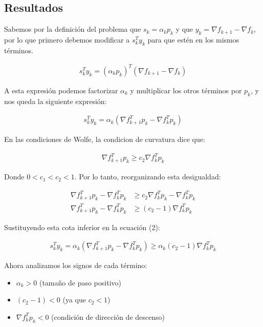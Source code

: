 \documentclass{article}
\begin{document}
\subsection{Resultados}
\setcounter{equation}{0}

Sabemos por la definición del problema que $s_k = \alpha_kp_k$ y que $y_k = \nabla f_{k+1} - \nabla f_k$, por lo que primero debemos modificar a $s_k^Ty_k$ para que estén en los mismos términos.

\begin{align}
    s_k^Ty_k = (\alpha_k p_k)^T(\nabla f_{k+1} - \nabla f_k)
\end{align}

A esta expresión podemos factorizar $\alpha_k$ y multiplicar los otros términos por $p_k$, y nos queda la siguiente expresión:

\begin{align}
    s_k^Ty_k = \alpha_k(\nabla f_{k+1}^Tp_k - \nabla f_k^Tp_k)
\end{align}

En las condiciones de Wolfe, la condicion de curvatura dice que:

\begin{align}
    \nabla f_{k+1}^T p_k \geq c_2 \nabla f_k^T p_k
\end{align}

Donde $0 < c_1 < c_2 < 1$. Por lo tanto, reorganizando esta desigualdad:

\begin{align}
    \nabla f_{k+1}^T p_k - \nabla f_k^T p_k &\geq c_2 \nabla f_k^T p_k - \nabla f_k^T p_k \\
    \nabla f_{k+1}^T p_k - \nabla f_k^T p_k &\geq (c_2 - 1) \nabla f_k^T p_k
\end{align}

Sustituyendo esta cota inferior en la ecuación (2):

\begin{align}
    s_k^Ty_k = \alpha_k(\nabla f_{k+1}^Tp_k - \nabla f_k^Tp_k) \geq \alpha_k(c_2 - 1) \nabla f_k^T p_k
\end{align}

Ahora analizamos los signos de cada término:

\begin{itemize}
    \item $\alpha_k > 0$ (tamaño de paso positivo)
    \item $(c_2 - 1) < 0$ (ya que $c_2 < 1$)
    \item $\nabla f_k^T p_k < 0$ (condición de dirección de descenso)
\end{itemize}
\end{document}
